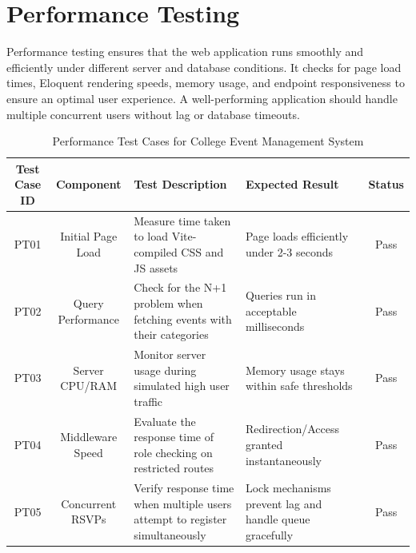 \section{Performance Testing}
Performance testing ensures that the web application runs smoothly and efficiently under different server and database conditions. It checks for page load times, Eloquent rendering speeds, memory usage, and endpoint responsiveness to ensure an optimal user experience. A well-performing application should handle multiple concurrent users without lag or database timeouts.\\
\begin{table}[H]
    \centering
    \renewcommand{\arraystretch}{1.3}
    \begin{tabular}{|c|c|p{4cm}|p{3cm}|c|}
        \hline
        \textbf{Test Case ID} & \textbf{Component} & \textbf{Test Description} & \textbf{Expected Result} & \textbf{Status} \\
        \hline
        PT01 & Initial Page Load & Measure time taken to load Vite-compiled CSS and JS assets & Page loads efficiently under 2-3 seconds & Pass \\
        \hline
        PT02 & Query Performance & Check for the N+1 problem when fetching events with their categories & Queries run in acceptable milliseconds & Pass \\
        \hline
        PT03 & Server CPU/RAM & Monitor server usage during simulated high user traffic & Memory usage stays within safe thresholds & Pass \\
        \hline
        PT04 & Middleware Speed & Evaluate the response time of role checking on restricted routes & Redirection/Access granted instantaneously & Pass \\
        \hline
        PT05 & Concurrent RSVPs & Verify response time when multiple users attempt to register simultaneously & Lock mechanisms prevent lag and handle queue gracefully & Pass \\
        \hline
    \end{tabular}
    \caption{Performance Test Cases for College Event Management System}
    \label{tab:performance_tests}
\end{table}
